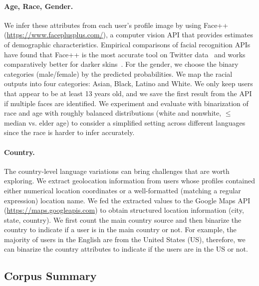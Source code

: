 \paragraph{Age, Race, Gender.}
We infer these attributes from each user's profile image by using Face++ (\url{https://www.faceplusplus.com/}),
a computer vision API that provides estimates of demographic characteristics.
Empirical comparisons of facial recognition APIs have found that Face++ is the most accurate tool on Twitter data~\cite{jung2018assessing} and works comparatively better for darker skins~\cite{buolamwini2018gender}.
For the gender, we choose the binary categories (male/female) by the predicted probabilities.
We map the racial outputs into four categories: Asian, Black, Latino and White.
We only keep users that appear to be at least 13 years old, and we save the first result from the API if multiple faces are identified.
We experiment and evaluate with binarization of race and age with roughly balanced distributions (white and nonwhite, $\leq$ median vs. elder age) to consider a simplified setting across different languages since the race is harder to infer accurately.

\paragraph{Country.}
The country-level language variations can bring challenges that are worth exploring.
We extract geolocation information from users whose profiles contained either numerical location coordinates or a well-formatted (matching a regular expression) location name. 
We fed the extracted values to the Google Maps API (\url{https://maps.googleapis.com}) to obtain structured location information (city, state, country).
We first count the main country source and then binarize the country to indicate if a user is in the main country or not. 
For example, the majority of users in the English are from the United States (US), therefore, we can binarize the country attributes to indicate if the users are in the US or not.


\subsection{Corpus Summary} 

